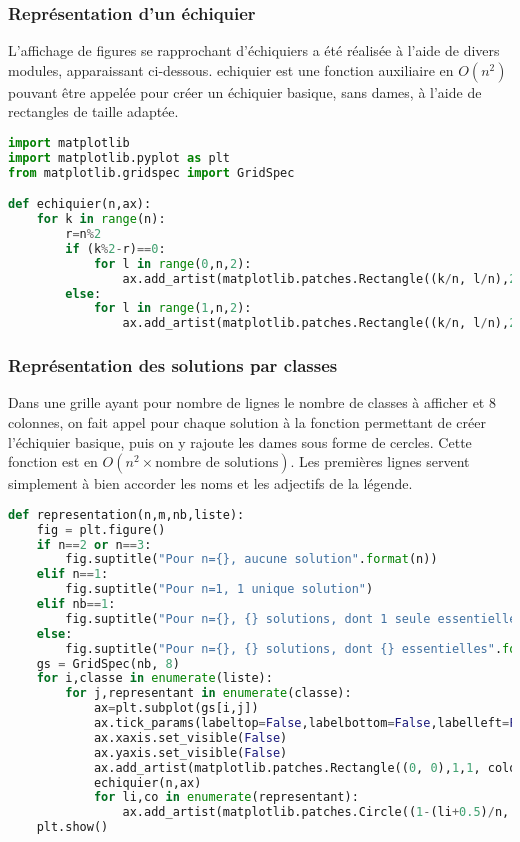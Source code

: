 \documentclass[a4paper]{article}
\begin{document}
\subsubsection{Représentation d'un échiquier}
L'affichage de figures se rapprochant d'échiquiers a été réalisée à l'aide de divers modules, apparaissant ci-dessous. echiquier est une fonction auxiliaire en $O(n^{2})$ pouvant être appelée pour créer un échiquier basique, sans dames, à l'aide de rectangles de taille adaptée.
\bigskip

\begin{lstlisting}[language=Python,keywordstyle=\color{blue},stringstyle=\color{purple},commentstyle=\color{green},breaklines=true,]
import matplotlib
import matplotlib.pyplot as plt
from matplotlib.gridspec import GridSpec

def echiquier(n,ax):
    for k in range(n):
        r=n%2
        if (k%2-r)==0:
            for l in range(0,n,2):
                ax.add_artist(matplotlib.patches.Rectangle((k/n, l/n),2/(2*n),2/(2*n),color = 'black',fill = True))
        else:
            for l in range(1,n,2):
                ax.add_artist(matplotlib.patches.Rectangle((k/n, l/n),2/(2*n),2/(2*n),color = 'black',fill = True))
\end{lstlisting}

\subsubsection{Représentation des solutions par classes}
Dans une grille ayant pour nombre de lignes le nombre de classes à afficher et $8$ colonnes, on fait appel pour chaque solution à la fonction permettant de créer l'échiquier basique, puis on y rajoute les dames sous forme de cercles. Cette fonction est en $O(n^{2}\times \text{nombre de solutions})$. Les premières lignes servent simplement à bien accorder les noms et les adjectifs de la légende.
\begin{lstlisting}[language=Python,keywordstyle=\color{blue},stringstyle=\color{purple},commentstyle=\color{green},breaklines=true,]
def representation(n,m,nb,liste):
    fig = plt.figure()
    if n==2 or n==3:
        fig.suptitle("Pour n={}, aucune solution".format(n))
    elif n==1:
        fig.suptitle("Pour n=1, 1 unique solution")
    elif nb==1:
        fig.suptitle("Pour n={}, {} solutions, dont 1 seule essentielle".format(n,m))
    else:
        fig.suptitle("Pour n={}, {} solutions, dont {} essentielles".format(n,m,nb))
    gs = GridSpec(nb, 8)
    for i,classe in enumerate(liste):
        for j,representant in enumerate(classe):
            ax=plt.subplot(gs[i,j])
            ax.tick_params(labeltop=False,labelbottom=False,labelleft=False,labelright=False)
            ax.xaxis.set_visible(False)
            ax.yaxis.set_visible(False)
            ax.add_artist(matplotlib.patches.Rectangle((0, 0),1,1, color = 'seashell',fill = True))
            echiquier(n,ax)
            for li,co in enumerate(representant):
                ax.add_artist(matplotlib.patches.Circle((1-(li+0.5)/n, (co+0.5)/n), 0.9/(2*n), color = 'red', fill=True))
    plt.show()
\end{lstlisting}
\end{document}
